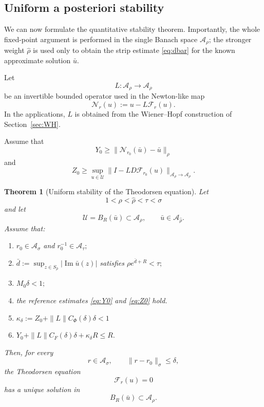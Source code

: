 \documentclass[11pt,a4paper]{amsart}
\newtheorem{theorem}{Theorem}[section]
\begin{document}
\subsection{Uniform a posteriori stability}

We can now formulate the quantitative stability theorem. Importantly,
the whole fixed-point argument is performed in the single Banach
space $\mathcal A_\rho$; the stronger weight $\widehat\rho$ is used
only to obtain the strip estimate \eqref{eq:dbar} for the known
approximate solution $\bar u$.

Let
\[
L:\mathcal A_\rho\longrightarrow\mathcal A_\rho
\]
be an invertible bounded operator used in the Newton-like map
\[
\mathcal N_r(u)
:=
u-L\mathcal F_r(u).
\]
In the applications, $L$ is obtained from the Wiener--Hopf
construction of Section~\ref{sec:WH}.

Assume that
\begin{equation}\label{eq:Y0}
	Y_0
	\ge
	\|\mathcal N_{r_0}(\bar u)-\bar u\|_\rho
\end{equation}
and
\begin{equation}\label{eq:Z0}
	Z_0
	\ge
	\sup_{u\in\mathcal U}
	\|I-LD\mathcal F_{r_0}(u)\|
	_{\mathcal A_\rho\to\mathcal A_\rho}.
\end{equation}

\begin{theorem}[Uniform stability of the Theodorsen equation]
	\label{thm:uniform-theodorsen}
	Let
	\[
	1<\rho<\widehat\rho<\tau<\sigma
	\]
	and let
	\[
	\mathcal U=B_R(\bar u)\subset\mathcal A_\rho,
	\qquad
	\bar u\in\mathcal A_{\widehat\rho}.
	\]
	Assume that:
	\begin{enumerate}
		\item $r_0\in\mathcal A_\sigma$ and $r_0^{-1}\in\mathcal A_\tau;$
		\item $\bar d:=\sup_{z\in S_{\widehat\rho}}|\operatorname{Im}\bar u(z)|$
satisfies $\rho e^{\bar d+R}<\tau;$
		\item $M_0\delta<1;$
		\item the reference estimates \eqref{eq:Y0} and \eqref{eq:Z0} hold.
		\item $\kappa_\delta:=Z_0+\|L\|C_\Phi(\delta)\delta<1$
		\item $Y_0+\|L\|C_F(\delta)\delta+\kappa_\delta R\le R.$
	\end{enumerate}
Then, for every
	\[
	r\in\mathcal A_\sigma,
	\qquad
	\|r-r_0\|_\sigma\le\delta,
	\]
	the Theodorsen equation
	\[
	\mathcal F_r(u)=0
	\]
	has a unique solution in
	\[
	B_R(\bar u)\subset\mathcal A_\rho.
	\]
\end{theorem}
\end{document}
